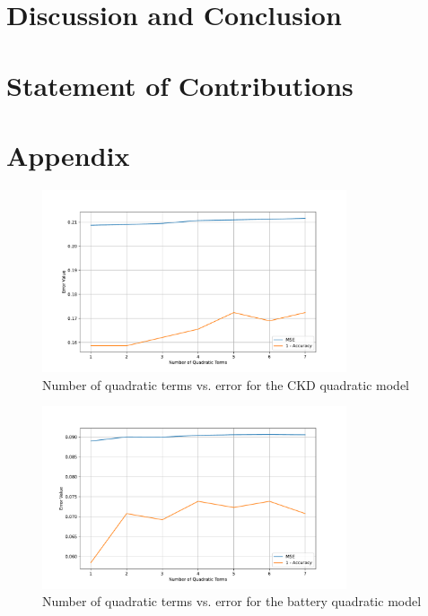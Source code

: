 \documentclass{article}
\begin{document}
\section{Discussion and Conclusion}

\section{Statement of Contributions}

\section{Appendix}

\begin{figure}[H]
  \centering
  \includegraphics[width=0.8\textwidth]{quad_ckd.pdf}
  \caption{Number of quadratic terms vs. error for the CKD quadratic model}
  \label{fig:quad_ckd}
\end{figure}

\begin{figure}[H]
  \centering
  \includegraphics[width=0.8\textwidth]{quad_battery.pdf}
  \caption{Number of quadratic terms vs. error for the battery quadratic model}
  \label{fig:quad_battery}
\end{figure}
\end{document}
